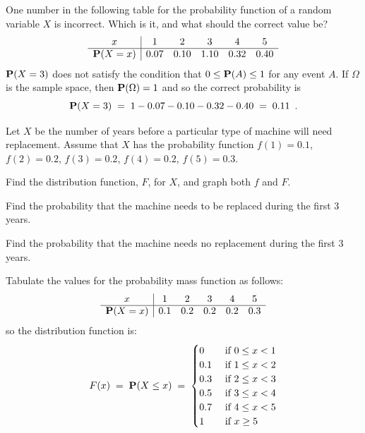 \begin{ExerciseList}
\Exercise[label={xRV1}]
One number in the following table for the probability function of a random variable $X$ is incorrect.  
Which is it, and what should the correct value be?
$$
\begin{array}{c|ccccc}
x&1&2&3&4&5\\\hline
\mathbf{P}(X=x)&0.07&0.10&1.10&0.32&0.40
\end{array}
$$
\Answer
$\mathbf{P}(X=3)$ does not satisfy the condition that $0\leq \mathbf{P}(A)\leq1$ for any event $A$.  
If $\Omega$ is the sample space, then $\mathbf{P}(\Omega)=1$ and so  the correct probability is 
\[
\mathbf{P}(X=3)\;=\;1-0.07-0.10-0.32-0.40\;=\;0.11 \enspace .
\]

\Exercise
Let $X$ be the number of years before a particular type of machine will need replacement.  
Assume that $X$ has the probability function $f(1)=0.1$, $f(2)=0.2$, $f(3)=0.2$, $f(4)=0.2$, $f(5)=0.3$.
\be
\item Find the distribution
  function, $F$,  for $X$, and graph both $f$ and $F$.

\item  Find the probability that the machine needs to be
  replaced during the first 3 years.

\item  Find the probability that the machine needs no
  replacement during the first 3 years.
\ee
\Answer
\be
\item  Tabulate the values for the probability mass function  as follows: $$
\begin{array}{c|ccccc}
x&1&2&3&4&5\\\hline
\mathbf{P}(X=x)&0.1&0.2&0.2&0.2&0.3
\end{array}
$$so the  distribution function is:
\[F(x)\; = \;\mathbf{P}(X \leq x) \;=\;
\begin{cases}
 0 & \text{ if }  0 \leq   x < 1\\
 0.1 & \text{ if } 1 \leq  x < 2\\
0.3 & \text{ if } 2 \leq x < 3\\
 0.5 & \text{ if } 3 \leq x < 4\\
0.7 & \text{ if }  4 \leq x < 5\\
 1& \text{ if }    x \geq 5
\end{cases}
\]






\end{ExerciseList}
